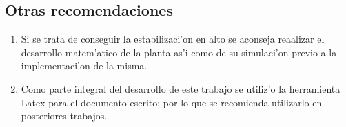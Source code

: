 \subsection{Otras recomendaciones}
\begin{enumerate}
	\item Si se trata de conseguir la estabilizaci'on en alto se aconseja reaalizar el desarrollo matem'atico de la planta as'i como de su simulaci'on previo a la implementaci'on de la misma. 
	\item Como parte integral del desarrollo de este trabajo se utiliz'o la herramienta Latex para el documento escrito; por lo que se recomienda utilizarlo en posteriores trabajos.
\end{enumerate}
